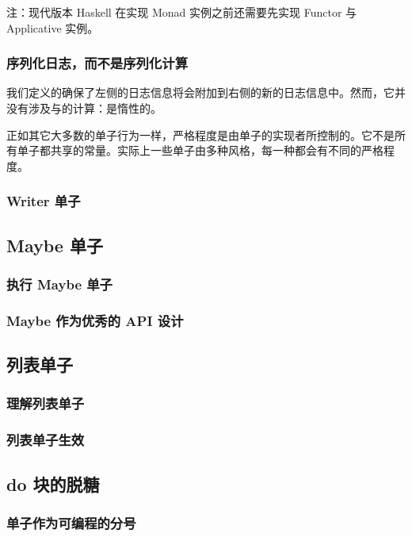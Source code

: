 \documentclass[./main.tex]{subfiles}
\begin{document}
注：现代版本 Haskell 在实现 Monad 实例之前还需要先实现 Functor 与 Applicative 实例。

\subsubsection*{序列化日志，而不是序列化计算}

我们定义的\acode{(>>=)}确保了左侧的日志信息将会附加到右侧的新的日志信息中。然而，它并没有涉及与的计算：\acode{(>>=)}是惰性的。

正如其它大多数的单子行为一样，严格程度是由单子的实现者所控制的。它不是所有单子都共享的常量。实际上一些单子由多种风格，每一种都会有不同的严格程度。

\subsubsection*{Writer 单子}

\subsection*{Maybe 单子}

\subsubsection*{执行 Maybe 单子}

\subsubsection*{Maybe 作为优秀的 API 设计}

\subsection*{列表单子}

\subsubsection*{理解列表单子}

\subsubsection*{列表单子生效}

\subsection*{do 块的脱糖}

\subsubsection*{单子作为可编程的分号}
\end{document}
